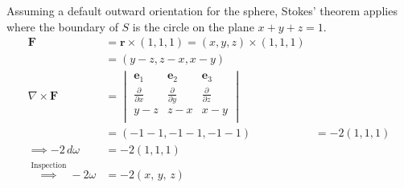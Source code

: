 \documentclass{article}
\newcommand{\parti}[1]{\frac{\partial}{\partial #1}}
\begin{document}
\begin{enumerate}
\begin{enumerate}
            Assuming a default outward orientation for the sphere, Stokes'
            theorem applies where the boundary of $S$ is the circle on the
            plane $x+y+z = 1$.
            \begin{align*}
                \boldsymbol F &= \boldsymbol r \times (1,1,1)
                = (x,y,z) \times (1,1,1) \\
                &= (y-z,z-x,x-y) \\
                \nabla \times \boldsymbol F &= 
                \begin{vmatrix}
                    \boldsymbol e_1 & \boldsymbol e_2 & \boldsymbol e_3 \\
                    \parti{x} & \parti{y} & \parti{z} \\
                    y - z & z - x & x - y \\
                \end{vmatrix} \\
                &= (-1 -1, -1 -1, -1 -1) &= -2(1,1,1) \\
                \implies -2 \, d\omega &= -2(1,1,1)  \\
                \overset{\text{Inspection}}{\implies} -2\omega &= 
                -2(x,\, y,\, z)
            \end{align*} 
            

\end{enumerate}
\end{enumerate}
\end{document}
